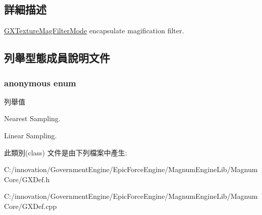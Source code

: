 \subsection{詳細描述}
\hyperlink{class_i_dream_sky_1_1_g_x_texture_mag_filter_mode}{G\+X\+Texture\+Mag\+Filter\+Mode} encapsulate magification filter. 

\subsection{列舉型態成員說明文件}
\subsubsection[{\texorpdfstring{anonymous enum}{anonymous enum}}]{\setlength{\rightskip}{0pt plus 5cm}anonymous enum}\hypertarget{class_i_dream_sky_1_1_g_x_texture_mag_filter_mode_aa9223abd2c36cde2aac7dd20063bfe0a}{}\label{class_i_dream_sky_1_1_g_x_texture_mag_filter_mode_aa9223abd2c36cde2aac7dd20063bfe0a}
\begin{Desc}
\item[列舉值]\par
\begin{description}
\item[{\em 
Nearest\hypertarget{class_i_dream_sky_1_1_g_x_texture_mag_filter_mode_aa9223abd2c36cde2aac7dd20063bfe0aa2eccce18269cdc2ee8ce33013f1b7da7}{}\label{class_i_dream_sky_1_1_g_x_texture_mag_filter_mode_aa9223abd2c36cde2aac7dd20063bfe0aa2eccce18269cdc2ee8ce33013f1b7da7}
}]Nearest Sampling. \item[{\em 
Linear\hypertarget{class_i_dream_sky_1_1_g_x_texture_mag_filter_mode_aa9223abd2c36cde2aac7dd20063bfe0aa9fd18a38929fbcfeb4758be4cb73938c}{}\label{class_i_dream_sky_1_1_g_x_texture_mag_filter_mode_aa9223abd2c36cde2aac7dd20063bfe0aa9fd18a38929fbcfeb4758be4cb73938c}
}]Linear Sampling. \end{description}
\end{Desc}


此類別(class) 文件是由下列檔案中產生\+:\begin{DoxyCompactItemize}
\item 
C\+:/innovation/\+Government\+Engine/\+Epic\+Force\+Engine/\+Magnum\+Engine\+Lib/\+Magnum\+Core/G\+X\+Def.\+h\item 
C\+:/innovation/\+Government\+Engine/\+Epic\+Force\+Engine/\+Magnum\+Engine\+Lib/\+Magnum\+Core/G\+X\+Def.\+cpp\end{DoxyCompactItemize}
